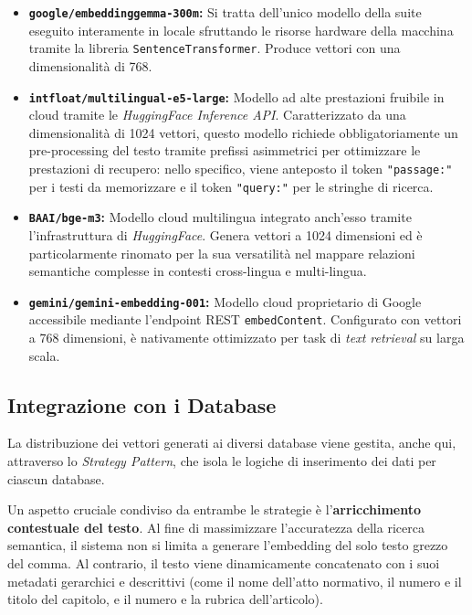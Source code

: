 \begin{itemize}
    \item \textbf{\texttt{google/embeddinggemma-300m}:} Si tratta dell'unico modello della suite eseguito interamente in locale sfruttando le risorse hardware della macchina tramite la libreria \texttt{SentenceTransformer}. Produce vettori con una dimensionalità di 768.
    
    \item \textbf{\texttt{intfloat/multilingual-e5-large}:} Modello ad alte prestazioni fruibile in cloud tramite le \textit{HuggingFace Inference API}. Caratterizzato da una dimensionalità di 1024 vettori, questo modello richiede obbligatoriamente un pre-processing del testo tramite prefissi asimmetrici per ottimizzare le prestazioni di recupero: nello specifico, viene anteposto il token \texttt{"passage:"} per i testi da memorizzare e il token \texttt{"query:"} per le stringhe di ricerca.
    
    \item \textbf{\texttt{BAAI/bge-m3}:} Modello cloud multilingua integrato anch'esso tramite l'infrastruttura di \textit{HuggingFace}. Genera vettori a 1024 dimensioni ed è particolarmente rinomato per la sua versatilità nel mappare relazioni semantiche complesse in contesti cross-lingua e multi-lingua.
    
    \item \textbf{\texttt{gemini/gemini-embedding-001}:} Modello cloud proprietario di Google accessibile mediante l'endpoint REST \texttt{embedContent}. Configurato con vettori a 768 dimensioni, è nativamente ottimizzato per task di \textit{text retrieval} su larga scala.
\end{itemize}

\subsection{Integrazione con i Database}
La distribuzione dei vettori generati ai diversi database viene gestita, anche qui, attraverso lo \textit{Strategy Pattern}, che isola le logiche di inserimento dei dati per ciascun database. 

Un aspetto cruciale condiviso da entrambe le strategie è l'\textbf{arricchimento contestuale del testo}. Al fine di massimizzare l'accuratezza della ricerca semantica, il sistema non si limita a generare l'embedding del solo testo grezzo del comma. Al contrario, il testo viene dinamicamente concatenato con i suoi metadati gerarchici e descrittivi (come il nome dell'atto normativo, il numero e il titolo del capitolo, e il numero e la rubrica dell'articolo).

